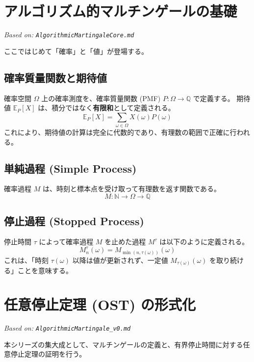 \documentclass[a4paper,11pt]{ltjsarticle}
\theoremstyle{definition}
\newcommand{\N}{\mathbb{N}}
\newcommand{\Q}{\mathbb{Q}}
\newcommand{\OmegaSpace}{\Omega}
\newcommand{\Expect}{\mathbb{E}}
\newcommand{\Tau}{\tau}
\begin{document}
\section{アルゴリズム的マルチンゲールの基礎}
\label{sec:martingale_core}
\textit{Based on: \texttt{AlgorithmicMartingaleCore.md}}

ここではじめて「確率」と「値」が登場する。

\subsection{確率質量関数と期待値}
確率空間 $\OmegaSpace$ 上の確率測度を、確率質量関数 (PMF) $P: \OmegaSpace \to \Q$ で定義する。
期待値 $\Expect_P[X]$ は、積分ではなく\textbf{有限和}として定義される。
\[ \Expect_P[X] = \sum_{\omega \in \OmegaSpace} X(\omega) P(\omega) \]
これにより、期待値の計算は完全に代数的であり、有理数の範囲で正確に行われる。

\subsection{単純過程 (Simple Process)}
確率過程 $M$ は、時刻と標本点を受け取って有理数を返す関数である。
\[ M: \N \to \OmegaSpace \to \Q \]

\subsection{停止過程 (Stopped Process)}
停止時間 $\Tau$ によって確率過程 $M$ を止めた過程 $M^\Tau$ は以下のように定義される。
\[ M^\Tau_n(\omega) = M_{\min(n, \Tau(\omega))}(\omega) \]
これは、「時刻 $\Tau(\omega)$ 以降は値が更新されず、一定値 $M_{\Tau(\omega)}(\omega)$ を取り続ける」ことを意味する。

\section{任意停止定理 (OST) の形式化}
\label{sec:ost}
\textit{Based on: \texttt{AlgorithmicMartingale\_v0.md}}

本シリーズの集大成として、マルチンゲールの定義と、有界停止時間に対する任意停止定理の証明を行う。
\end{document}
